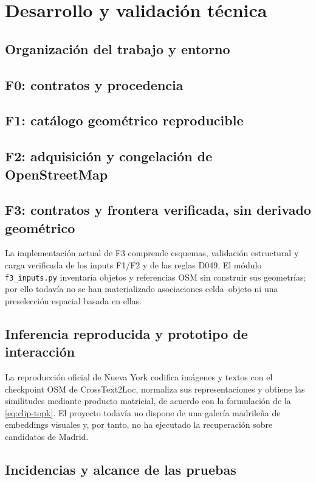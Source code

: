 \chapter{Desarrollo y validación técnica}
\label{cap:implementacion}

\section{Organización del trabajo y entorno}
\label{sec:entorno}

\section{F0: contratos y procedencia}
\label{sec:implementacion-f0}

\section{F1: catálogo geométrico reproducible}
\label{sec:implementacion-f1}

\section{F2: adquisición y congelación de OpenStreetMap}
\label{sec:implementacion-f2}

\section{F3: contratos y frontera verificada, sin derivado geométrico}
\label{sec:implementacion-f3}
La implementación actual de F3 comprende esquemas, validación estructural y carga verificada de los inputs F1/F2 y de las reglas D049. El módulo \texttt{f3\_inputs.py} inventaría objetos y referencias OSM sin construir sus geometrías; por ello todavía no se han materializado asociaciones celda--objeto ni una preselección espacial basada en ellas.

\section{Inferencia reproducida y prototipo de interacción}
\label{sec:implementacion-modelo}
La reproducción oficial de Nueva York codifica imágenes y textos con el checkpoint OSM de CrossText2Loc, normaliza sus representaciones y obtiene las similitudes mediante producto matricial, de acuerdo con la formulación de la \cref{eq:clip-topk}. El proyecto todavía no dispone de una galería madrileña de embeddings visuales y, por tanto, no ha ejecutado la recuperación sobre candidatos de Madrid.

\section{Incidencias y alcance de las pruebas}
\label{sec:validacion-tecnica}
